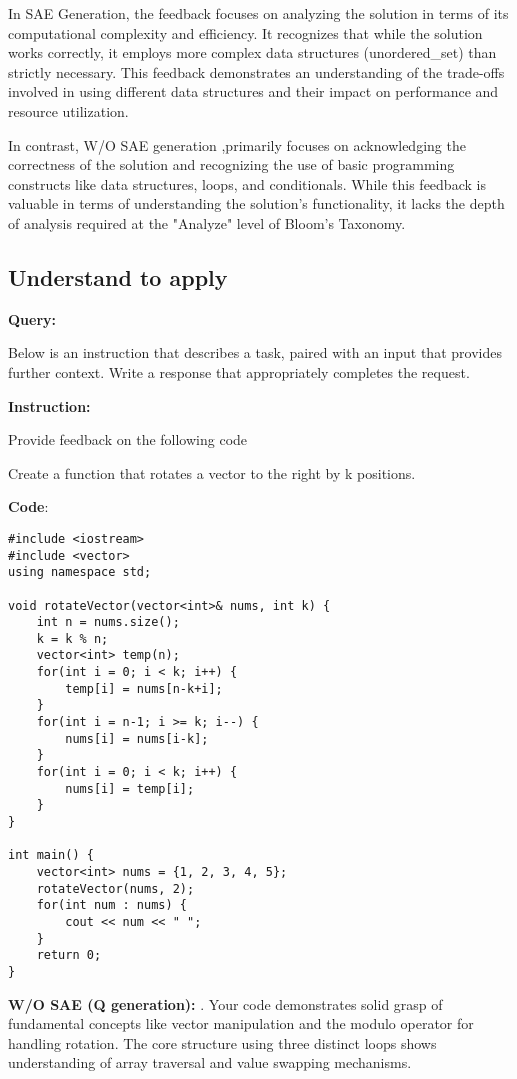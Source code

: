 In SAE Generation, the feedback focuses on analyzing the solution in terms of its computational complexity and efficiency. It recognizes that while the solution works correctly, it employs more complex data structures (unordered\_set) than strictly necessary. This feedback demonstrates an understanding of the trade-offs involved in using different data structures and their impact on performance and resource utilization.

In contrast, W/O SAE generation ,primarily focuses on acknowledging the correctness of the solution and recognizing the use of basic programming constructs like data structures, loops, and conditionals. While this feedback is valuable in terms of understanding the solution's functionality, it lacks the depth of analysis required at the "Analyze" level of Bloom's Taxonomy.


\medskip
\subsection*{Understand to apply}


\textbf{Query:}

Below is an instruction that describes a task, paired with an input that provides further context. Write a response that appropriately completes the request.\par
\textbf{Instruction:}\par
Provide feedback on the following code \par
Create a function that rotates a vector to the right by k positions.\par

\textbf{Code}:
\begin{lstlisting}
#include <iostream>
#include <vector>
using namespace std;

void rotateVector(vector<int>& nums, int k) {
    int n = nums.size();
    k = k % n;
    vector<int> temp(n);
    for(int i = 0; i < k; i++) {
        temp[i] = nums[n-k+i];
    }
    for(int i = n-1; i >= k; i--) {
        nums[i] = nums[i-k];
    }
    for(int i = 0; i < k; i++) {
        nums[i] = temp[i];
    }
}

int main() {
    vector<int> nums = {1, 2, 3, 4, 5};
    rotateVector(nums, 2);
    for(int num : nums) {
        cout << num << " ";
    }
    return 0;
}

\end{lstlisting}
\textbf{W/O SAE (Q generation):} . Your code demonstrates solid grasp of fundamental concepts like vector manipulation and the modulo operator for handling rotation. The core structure using three distinct loops shows understanding of array traversal and value swapping mechanisms.\par

